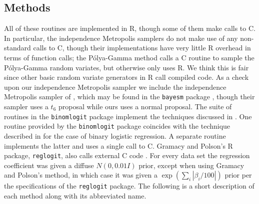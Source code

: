 \documentclass[11pt]{article}
\newcommand{\Polya}{P\'{o}lya}
\begin{document}
\subsection{Methods}

All of these routines are implemented in R, though some of them make calls to C.
In particular, the independence Metropolis samplers do not make use of any
non-standard calls to C, though their implementations have very little R
overhead in terms of function calls; the \Polya-Gamma method calls a C routine
to sample the \Polya-Gamma random variates, but otherwise only uses R.  We think
this is fair since other basic random variate generators in R call compiled
code.  As a check upon our independence Metropolis sampler we include the
independence Metropolis sampler of \cite{rossi-etal-2005}, which may be found in
the \texttt{bayesm} package \citep{bayesm-2012}, though their sampler uses a
$t_6$ proposal while ours uses a normal proposal.  The suite of routines in the
\texttt{binomlogit} package \citep{binomlogit-2012} implement the techniques
discussed in \cite{fussl-etal-2011-slides}.  One routine provided by the
\texttt{binomlogit} package coincides with the technique described in
\cite{fruhwirth-schnatter-fruhwirth-2010} for the case of binary logistic
regression.  A separate routine implements the latter and uses a single call to
C.  Gramacy and Polson's R package, \texttt{reglogit}, also calls external C
code \citep{reglogit-2012}.  For every data set the regression coefficient was
given a diffuse $N(0, 0.01 I)$ prior, except when using Gramacy and Polson's
method, in which case it was given a $\exp(\sum_{i} |\beta_i / 100|)$ prior per
the specifications of the \texttt{reglogit} package.  The following is a short
description of each method along with its abbreviated name.
\end{document}
